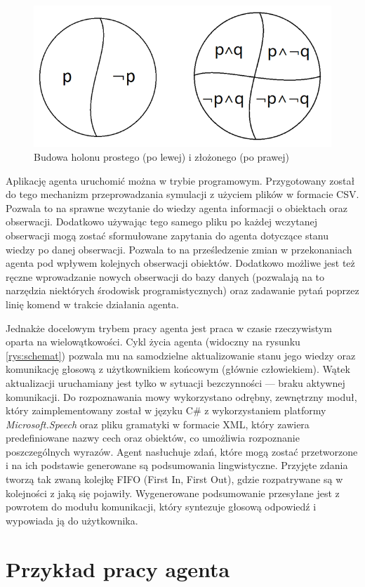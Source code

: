 \begin{figure}  
	\centering\includegraphics[width=.6\textwidth]{img/holony}
	\caption{Budowa holonu prostego (po lewej) i złożonego (po prawej)}
	\label{rys:holony}
\end{figure}

Aplikację agenta uruchomić można w trybie programowym. Przygotowany został do tego mechanizm przeprowadzania symulacji z użyciem plików w formacie CSV. Pozwala to na sprawne wczytanie do wiedzy agenta informacji o obiektach oraz obserwacji. Dodatkowo używając tego samego pliku po każdej wczytanej obserwacji mogą zostać sformułowane zapytania do agenta dotyczące stanu wiedzy po danej obserwacji. Pozwala to na prześledzenie zmian w przekonaniach agenta pod wpływem kolejnych obserwacji obiektów. Dodatkowo możliwe jest też ręczne wprowadzanie nowych obserwacji do bazy danych (pozwalają na to narzędzia niektórych środowisk programistycznych) oraz zadawanie pytań poprzez linię komend w trakcie działania agenta. 

Jednakże docelowym trybem pracy agenta jest praca w czasie rzeczywistym oparta na wielowątkowości. Cykl życia agenta (widoczny na rysunku \ref{rys:schemat}) pozwala mu na samodzielne aktualizowanie stanu jego wiedzy oraz komunikację głosową z użytkownikiem końcowym (głównie człowiekiem). Wątek aktualizacji uruchamiany jest tylko w sytuacji bezczynności --- braku aktywnej komunikacji. Do rozpoznawania mowy wykorzystano odrębny, zewnętrzny moduł, który zaimplementowany został w języku C\# z wykorzystaniem platformy \textit{Microsoft.Speech} oraz pliku gramatyki w formacie XML, który zawiera predefiniowane nazwy cech oraz obiektów, co umożliwia rozpoznanie poszczególnych wyrazów. Agent nasłuchuje zdań, które mogą zostać przetworzone i na ich podstawie generowane są podsumowania lingwistyczne. Przyjęte zdania tworzą tak zwaną kolejkę FIFO (First In, First Out), gdzie rozpatrywane są w kolejności z jaką się pojawiły. Wygenerowane podsumowanie przesyłane jest z powrotem do modułu komunikacji, który syntezuje głosową odpowiedź i wypowiada ją do użytkownika.


\section{Przykład pracy agenta}

